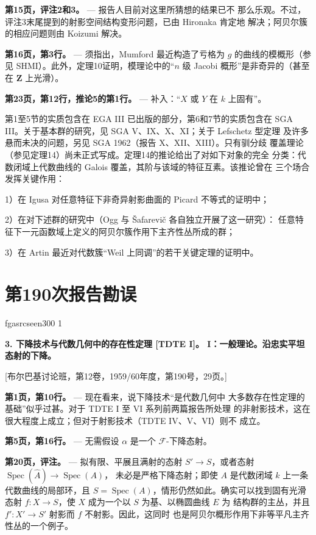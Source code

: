 \documentclass[12pt,twoside,openany]{book}
\numberwithin{equation}{section}
\newcommand{\fgaunitid}{unbound}
\newcommand{\src}[1]{%
  \phantomsection
  \hypertarget{src:\fgaunitid:#1}{}%
  \hypertarget{fga.\fgaunitid.p#1}{}%
  \ifcsname fgasrcseen#1\endcsname\else
    \expandafter\gdef\csname fgasrcseen#1\endcsname{1}%
    \hypertarget{src:#1}{}%
  \fi
  \marginpar{\raggedleft\footnotesize\sffamily #1}%
}
\newcommand{\sid}[1]{%
  \gdef\fgaunitid{#1}%
  \phantomsection\hypertarget{fga:#1}{}\hypertarget{fga.#1}{}%
}
\theoremstyle{plain}
\theoremstyle{definition}
\theoremstyle{remark}
\begin{document}
\noindent\textbf{第15页，评注2和3。} --- 报告人目前对这里所猜想的结果已不
那么乐观。不过，评注3末尾提到的射影空间结构变形问题，已由 Hironaka 肯定地
解决；阿贝尔簇的相应问题则由 Koizumi 解决。

\noindent\textbf{第16页，第3行。} --- 须指出，Mumford 最近构造了亏格为
$g$ 的曲线的模概形（参见 SHMI）。此外，定理10证明，模理论中的“$n$ 级
Jacobi 概形”是非奇异的（甚至在 $\mathbf Z$ 上光滑）。

\noindent\textbf{第23页，第12行，推论5的第1行。} --- 补入：“$X$ 或 $Y$
在 $k$ 上固有”。

第1至5节的实质包含在 EGA III 已出版的部分，第6和7节的实质包含在
SGA III。关于基本群的研究，见 SGA V、IX、X、XI；关于 Lefschetz 型定理
及许多悬而未决的问题，另见 SGA 1962（报告 X、XII、XIII）。只有驯分歧
覆盖理论（参见定理14）尚未正式写成。定理14的推论给出了对如下对象的完全
分类：代数闭域上代数曲线的 Galois 覆盖，其阶与该域的特征互素。该推论曾在
三个场合发挥关键作用：

1）在 Igusa 对任意特征下非奇异射影曲面的 Picard 不等式的证明中；

2）在对下述群的研究中（Ogg 与 Šafarevič 各自独立开展了这一研究）：
任意特征下一元函数域上定义的阿贝尔簇作用下主齐性丛所成的群；

3）在 Artin 最近对代数簇“Weil 上同调”的若干关键定理的证明中。


\clearpage
\chapter*{第190次报告勘误}
\sid{e190}
\setcounter{footnote}{0}
\src{300}

\noindent\textbf{3. 下降技术与代数几何中的存在性定理 [TDTE I]。
I：一般理论。沿忠实平坦态射的下降。}

\begin{center}
[布尔巴基讨论班，第12卷，1959/60年度，第190号，29页。]
\end{center}

\noindent\textbf{第1页，第10行。} --- 现在看来，说下降技术“是代数几何中
大多数存在性定理的基础”似乎过甚。对于 TDTE I 至 VI 系列前两篇报告所处理
的非射影技术，这在很大程度上成立；但对于射影技术（TDTE IV、V、VI）则不
成立。

\noindent\textbf{第5页，第16行。} --- 无需假设 $\alpha$ 是一个
$\mathcal F$-下降态射。

\noindent\textbf{第20页，评注。} --- 拟有限、平展且满射的态射
$S'\longrightarrow S$，或者态射
$\operatorname{Spec}(\widehat A)\longrightarrow\operatorname{Spec}(A)$，
未必是严格下降态射；即使 $A$ 是代数闭域 $k$ 上一条代数曲线的局部环，且
$S=\operatorname{Spec}(A)$，情形仍然如此。确实可以找到固有光滑态射
$f:X\longrightarrow S$，使 $X$ 成为一个以 $S$ 为基、以椭圆曲线 $E$ 为
结构群的主丛，并且 $f':X'\longrightarrow S'$ 射影而 $f$ 不射影。因此，这同时
也是阿贝尔概形作用下非等平凡主齐性丛的一个例子。
\end{document}
